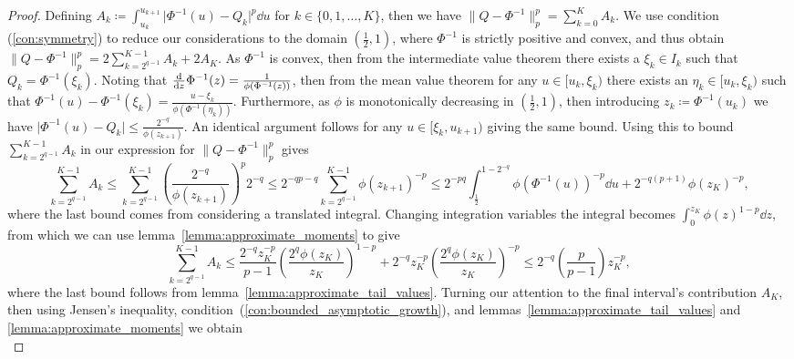 \documentclass[9pt,a4paper,english]{extarticle}
\begin{document}
\begin{proof} Defining $ A_k \coloneqq \int_{u_k}^{u_{k+1}} \lvert\Phi^{-1}(u) - Q_k\rvert^p \dd{u} $ for $ k \in \{0,1, \ldots, K\} $, then we have $ \lVert Q - \Phi^{-1} \rVert_p^p = \sum_{k=0}^{K} A_k $.  We use condition (\ref{con:symmetry}) to reduce our considerations to the domain $ (\tfrac{1}{2}, 1) $, where $ \Phi^{-1} $ is strictly positive and convex, and thus obtain $ \lVert Q - \Phi^{-1} \rVert_p^p = 2 \sum_{k=2^{q-1}}^{K-1} A_k + 2 A_K $. As $ \Phi^{-1} $ is convex, then from the intermediate value theorem there exists a $ \xi_k \in I_k $ such that $ Q_k = \Phi^{-1}(\xi_k) $. Noting that $ \dv{z} \Phi^{-1}(z) = \tfrac{1}{\phi(\Phi^{-1}(z))} $, then from the mean value theorem  for any $ u \in [u_k, \xi_k)$ there exists an $ \eta_k \in [u_k, \xi_k)$ such that $ \Phi^{-1}(u) - \Phi^{-1}(\xi_k) = \tfrac{u - \xi_k}{\phi(\Phi^{-1}(\eta_k))} $. Furthermore, as $ \phi $ is monotonically decreasing in $ (\tfrac{1}{2}, 1) $, then introducing $ z_k \coloneqq \Phi^{-1}(u_k) $ we have $ \lvert \Phi^{-1}(u) - Q_k\rvert \leq \tfrac{2^{-q}}{\phi(z_{k+1})}$. An identical argument follows for any $ u \in [\xi_k, u_{k+1})$ giving the same bound.  Using this to bound $ \sum_{k=2^{q-1}}^{K-1} A_k $ in our expression for $ \lVert Q - \Phi^{-1}\rVert_p^p $ gives
\begin{equation*}
\sum_{k=2^{q-1}}^{K-1} A_k 
\leq \sum_{k=2^{q-1}}^{K - 1} \left(\frac{2^{-q}}{\phi(z_{k+1})}\right)^p 2^{-q} 
\leq 2^{-qp - q} \sum_{k=2^{q-1}}^{K - 1}  \phi(z_{k+1})^{-p} 
\leq 2^{-pq} \int_{\frac{1}{2}}^{1 - 2^{-q}} \phi(\Phi^{-1}(u))^{-p} \dd{u} + 2^{-q(p+1)}\phi(z_K)^{-p},
\end{equation*}
where the last bound comes from considering a translated integral. Changing integration variables the integral becomes $  \int_{0}^{z_K} \phi(z)^{1-p} \dd{z} $, from which we can use lemma~\ref{lemma:approximate_moments} to give 
\begin{equation*}
\sum_{k=2^{q-1}}^{K-1} A_k 
\leq \frac{2^{-q} z_K^{-p}}{p-1} \left(\frac{2^q\phi(z_K)}{z_K}\right)^{1-p} + 2^{-q}z_K^{-p} \left(\frac{2^q\phi(z_K)}{z_K}\right)^{-p}
\leq 2^{-q} \left(\frac{p}{p-1}\right) z_K^{-p},
\end{equation*}
where the last bound follows from lemma~\ref{lemma:approximate_tail_values}. Turning our attention to the final interval's contribution $ A_K $, then using Jensen's inequality, condition~(\ref{con:bounded_asymptotic_growth}), and lemmas~\ref{lemma:approximate_tail_values} and \ref{lemma:approximate_moments} we obtain
\begin{equation*}

\end{equation*}
\end{proof}
\end{document}
